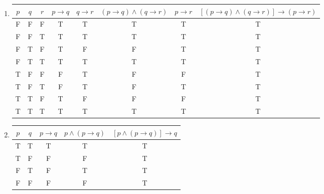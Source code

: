\documentclass[11pt]{article}
\begin{document}
\begin{enumerate}
\begin{enumerate}
                \item
                \begin{tabular}{|c|c|c|c|c|c|c|c|}
                        \hline
                        $p$ & $q$ & $r$ & $p \rightarrow q$ & $q \rightarrow r$ & $(p\rightarrow q) \land (q \rightarrow r)$ & $p \rightarrow r$ & $[(p\rightarrow q) \land (q\rightarrow r)] \rightarrow (p\rightarrow r)$\\
                        \hline
                        F & F & F & T & T & T & T & T\\
                        F & F & T & T & T & T & T & T\\
                        F & T & F & T & F & F & T & T\\
                        F & T & T & T & T & T & T & T\\
                        T & F & F & F & T & F & F & T\\
                        T & F & T & F & T & F & T & T\\
                        T & T & F & T & F & F & F & T\\
                        T & T & T & T & T & T & T & T\\
                        \hline
                    \end{tabular}
                
                \item 
                    \begin{tabular}{|c|c|c|c|c|}
                        \hline
                        $p$ & $q$ & $p \rightarrow q$ & $p \land (p\rightarrow q)$ & $[p\land (p\rightarrow q)] \rightarrow q$\\
                        \hline
                        T & T & T & T & T\\
                        T & F & F & F & T\\
                        F & T & F & T & T\\
                        F & F & F & F & T\\
                        \hline
                    \end{tabular}
            \end{enumerate}

\end{enumerate}
\end{document}
